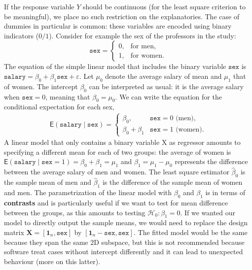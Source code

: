 \documentclass[
  11pt,
  letterpaper,
]{book}
\theoremstyle{definition}
\theoremstyle{definition}
\theoremstyle{definition}
\theoremstyle{remark}
\begin{document}
If the response variable \(Y\) should be continuous (for the least square criterion to be meaningful), we place no such restriction on the explanatories. The case of dummies in particular is common: these variables are encoded using binary indicators (\(0/1\)). Consider for example the sex of the professors in the study:
\[\texttt{sex} = \begin{cases} 0 , & \text{for men},\\
1, & \text{for women.}
\end{cases}
\]
The equation of the simple linear model that includes the binary variable \(\texttt{sex}\) is \(\texttt{salary} = \beta_0 + \beta_1 \texttt{sex} + \varepsilon\). Let \(\mu_0\) denote the average salary of mean and \(\mu_1\) that of women. The intercept \(\beta_0\) can be interpreted as usual: it is the average salary when \(\texttt{sex}=0\), meaning that \(\beta_0=\mu_0\). We can write the equation for the conditional expectation for each sex,
\begin{align*}
\mathsf{E}(\texttt{salary} \mid \texttt{sex})= \begin{cases}
\beta_0, & \texttt{sex}=0 \text{ (men)}, \\
\beta_0 + \beta_1 & \texttt{sex}=1 \text{ (women)}.
\end{cases}
\end{align*}
A linear model that only contains a binary variable \(\mathrm{X}\) as regressor amounts to specifying a different mean for each of two groups: the average of women is \(\mathsf{E}(\texttt{salary} \mid \texttt{sex}=1) = \beta_0 + \beta_1 = \mu_1\) and \(\beta_1=\mu_1-\mu_0\) represents the difference between the average salary of men and women. The least square estimator \(\widehat{\beta}_0\) is the sample mean of men and \(\widehat{\beta}_1\) is the difference of the sample mean of women and men. The parametrization of the linear model with \(\beta_0\) and \(\beta_1\) is in terms of \textbf{contrasts} and is particularly useful if we want to test for mean difference between the groups, as this amounts to testing \(\mathscr{H}_0: \beta_1=0\). If we wanted our model to directly output the sample means, we would need to replace the design matrix \(\mathbf{X}=[\mathbf{1}_n, \texttt{sex}]\) by \([\mathbf{1}_n- \texttt{sex}, \texttt{sex}]\). The fitted model would be the same because they span the same 2D subspace, but this is not recommended because software treat cases without intercept differently and it can lead to unexpected behaviour (more on this latter).
\end{document}
